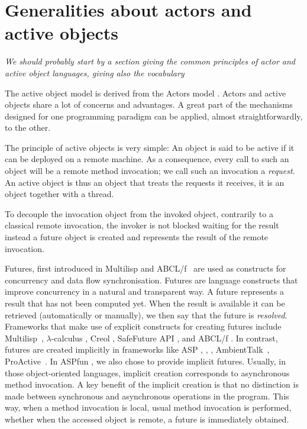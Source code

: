 
\section{Generalities about actors and active objects}
\emph{We should probably start by  a section giving the common principles of actor and 
active object languages, giving also the vocabulary}

The active object model is  derived from the Actors
model \cite{DBLP:conf/birthday/AghaT04,agha97foundation,Agha86-book}. Actors and active objects share
a lot of concerns and advantages. A great part of the mechanisms
designed for one programming paradigm can be applied, almost
straightforwardly, to the other.


The principle of active objects is very simple: An object is said to be
active if it can be deployed on a remote machine. As a consequence,
every call to such an object will be a remote method invocation; we
call such an invocation a \emph{request}. An active object is thus an
object that treats the requests it receives, it is an object together
with a thread.

To decouple the invocation object from the invoked object, contrarily
to a classical remote invocation, the invoker is not blocked waiting
for the result instead a future object is created and represents the
result of the remote invocation.

Futures, first introduced in Multilisp \cite{Halstead85} and ABCL/f~\cite{ABCL1994}
are used as constructs for concurrency and data
flow synchronisation. Futures are language constructs that improve
concurrency in a natural and transparent way. A future represents a
result that has not been computed yet. When the result is available it
can be retrieved (automatically or manually), we then say that the
future is \emph{resolved}.
Frameworks that make use
of explicit constructs for creating futures include
Multilisp~\cite{Halstead85}, $\lambda$-calculus \cite{jlambda-fut06}, Creol
\cite{Elinar2006}, SafeFuture API \cite{SafeFutures05}, and ABCL/f
\cite{ABCL1994}. In contrast, futures are created implicitly in
frameworks like  ASP \cite{CHS-IC2008}, \cite{CHSPOPL04},
\cite{CH-book},
AmbientTalk~\cite{DedeckerCMDM-ecoop06},
ProActive~\cite{CDD:CMST06}. In  ASPfun \cite{HKL:SCP11},
\cite{HK:FOCLASA09} we also chose to provide implicit
futures. Usually, in those object-oriented languages,
implicit creation corresponds to asynchronous method invocation. A key
benefit of the implicit creation is that no distinction is made
between synchronous and asynchronous operations in the program.
This way, when a method invocation is local, usual method invocation
is performed, whether when the accessed object is remote, a future is
immediately obtained.


